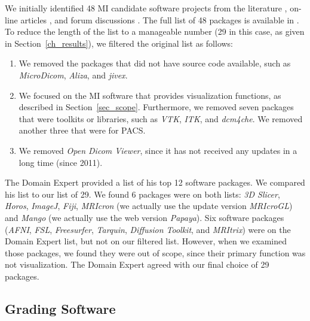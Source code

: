 \documentclass[11pt]{article}
\begin{document}
We initially identified 48 MI candidate software projects from the literature
\citep{Bjorn2017, Bruhschwein2019, Haak2015}, on-line articles \citep{Emms2019,
Hasan2020, Mu2019}, and forum discussions \citep{Samala2014}.  The full list of
48 packages is available in \citet{Dong2021}.  To reduce the length of the list
to a manageable number (29 in this case, as given in Section~\ref{ch_results}),
we filtered the original list as follows:

\begin{enumerate}

\item We removed the packages that did not have source code available, such as
\textit{MicroDicom}, \textit{Aliza}, and \textit{jivex}.

\item We focused on the MI software that provides visualization functions, as
described in Section~\ref{sec_scope}. Furthermore, we removed seven packages that were
toolkits or libraries, such as \textit{VTK}, \textit{ITK}, and \textit{dcm4che}.
We removed another three that were for PACS.

\item We removed \textit{Open Dicom Viewer}, since it has not received any
updates in a long time (since 2011).

\end{enumerate}

The Domain Expert provided a list of his top 12 software packages.  We compared
his list to our list of 29.  We found 6 packages were on both lists: \textit{3D
Slicer}, \textit{Horos}, \textit{ImageJ}, \textit{Fiji}, \textit{MRIcron} (we
actually use the update version \textit{MRIcroGL}) and \textit{Mango} (we
actually use the web version \textit{Papaya}).  Six software packages
(\textit{AFNI}, \textit{FSL}, \textit{Freesurfer}, \textit{Tarquin},
\textit{Diffusion Toolkit}, and \textit{MRItrix}) were on the Domain Expert
list, but not on our filtered list.  However, when we examined those packages,
we found they were out of scope, since their primary function was not
visualization.  The Domain Expert agreed with our final choice of 29 packages.

\subsection{Grading Software} \label{sec_grading_software}
\end{document}
